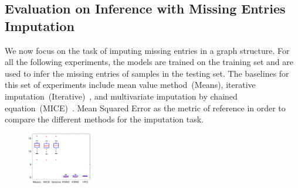 \documentclass[sigconf, anonymous, review]{acmart}
\theoremstyle{plain}
\theoremstyle{definition}
\theoremstyle{remark}
\begin{document}
\subsection{Evaluation on Inference with Missing Entries Imputation}%
We now focus on the task of imputing missing entries in a graph structure.
For all the following experiments, the models are trained on the training set and are used to infer the missing entries of samples in the testing set. The baselines for this set of experiments include mean value method~(Means), iterative imputation~(Iterative)~\cite{buck1960method}, and multivariate imputation by chained equation~(MICE)~\cite{van2011mice}.  Mean Squared Error as the metric of reference in order to compare the different methods for the imputation task. 

\begin{figure}[b!]
  \centering
       \includegraphics[width=0.25\textwidth]{fig/sim_box.eps}
    \label{fig:sim}
\end{figure}
\end{document}
